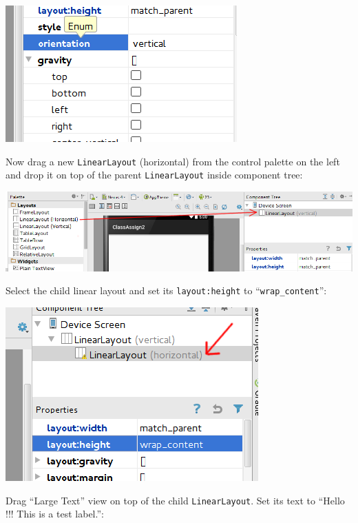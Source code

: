 \begin{center}
	\includegraphics[scale=0.4]{chapters/ch03/images/20}
\end{center}

Now drag a new \texttt{LinearLayout} (horizontal) from the control palette on the left and drop it on top of the parent \texttt{LinearLayout} inside component tree:

\begin{center}
	\includegraphics[scale=0.4]{chapters/ch03/images/21}
\end{center}

Select the child linear layout and set its \texttt{layout:height} to ``\texttt{wrap\_content}'':

\begin{center}
	\includegraphics[scale=0.4]{chapters/ch03/images/22}
\end{center}

Drag ``Large Text'' view on top of the child \texttt{LinearLayout}. Set its text to ``Hello !!! This is a test label.'':

